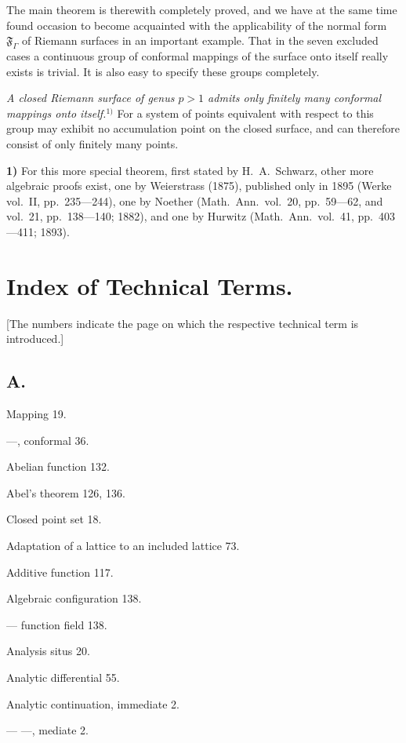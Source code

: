 \documentclass{article}
\begin{document}
The main theorem is therewith completely proved, and we have at the same time found occasion to become acquainted with the applicability of the normal form $\mathfrak{F}_\varGamma$ of Riemann surfaces in an important example. That in the seven excluded cases a continuous group of conformal mappings of the surface onto itself really exists is trivial. It is also easy to specify these groups completely.

\emph{A closed Riemann surface of genus $p > 1$ admits only finitely many conformal mappings onto itself.}${}^{1)}$ For a system of points equivalent with respect to this group may exhibit no accumulation point on the closed surface, and can therefore consist of only finitely many points.

\textbf{1)} For this more special theorem, first stated by H.~A.~Schwarz, other more algebraic proofs exist, one by Weierstrass (1875), published only in 1895 (Werke vol.~II, pp.~235---244), one by Noether (Math.\ Ann.\ vol.~20, pp.~59---62, and vol.~21, pp.~138---140; 1882), and one by Hurwitz (Math.\ Ann.\ vol.~41, pp.~403---411; 1893).


\section*{Index of Technical Terms.}

[The numbers indicate the page on which the respective technical term is introduced.]

\subsection*{A.}

Mapping 19.

---, conformal 36.

Abelian function 132.

Abel's theorem 126, 136.

Closed point set 18.

Adaptation of a lattice to an included lattice 73.

Additive function 117.

Algebraic configuration 138.

--- function field 138.

Analysis situs 20.

Analytic differential 55.

Analytic continuation, immediate 2.

--- ---, mediate 2.
\end{document}
